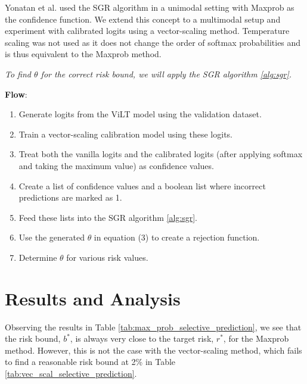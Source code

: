 \documentclass[
	english,
	accentcolor=8b,
	type=intern,
	marginpar=false
	]{tudapub}
\begin{document}
Yonatan et al. used the SGR algorithm in a unimodal setting with Maxprob as the confidence function. We extend this concept to a multimodal setup and experiment with calibrated logits using a vector-scaling method. Temperature scaling was not used as it does not change the order of softmax probabilities and is thus equivalent to the Maxprob method.

\textit{To find $\theta$ for the correct risk bound, we will apply the SGR algorithm \ref{alg:sgr}.}

\textbf{Flow}:
\begin{enumerate}
    \item Generate logits from the ViLT model using the validation dataset.
    \item Train a vector-scaling calibration model using these logits.
    \item Treat both the vanilla logits and the calibrated logits (after applying softmax and taking the maximum value) as confidence values.
    \item Create a list of confidence values and a boolean list where incorrect predictions are marked as 1.
    \item Feed these lists into the SGR algorithm \ref{alg:sgr}.
    \item Use the generated $\theta$ in equation (3) to create a rejection function.
    \item Determine $\theta$ for various risk values.
\end{enumerate}

\section{Results and Analysis}
\label{sec:analysis}
Observing the results in Table \ref{tab:max_prob_selective_prediction}, we see that the risk bound, \( b^* \), is always very close to the target risk, \( r^* \), for the Maxprob method. However, this is not the case with the vector-scaling method, which fails to find a reasonable risk bound at 2\% in Table \ref{tab:vec_scal_selective_prediction}.
\end{document}
